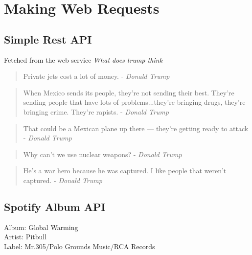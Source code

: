 \documentclass{article}
\begin{document}
  

  \section{Making Web Requests}
  \label{sec:Making Web Requests}

    \subsection{Simple Rest API}
    \label{sub:Simple Rest API}
      Fetched from the web service \textit{What does trump think}\\
                    \begin{quote}
          Private jets cost a lot of money. - \textit{Donald Trump}
        \end{quote}
                    \begin{quote}
          When Mexico sends its people, they're not sending their best. They're sending people that have lots of problems...they're bringing drugs, they're bringing crime. They're rapists. - \textit{Donald Trump}
        \end{quote}
                    \begin{quote}
          That could be a Mexican plane up there — they're getting ready to attack - \textit{Donald Trump}
        \end{quote}
                    \begin{quote}
          Why can’t we use nuclear weapons? - \textit{Donald Trump}
        \end{quote}
                    \begin{quote}
          He’s a war hero because he was captured. I like people that weren’t captured. - \textit{Donald Trump}
        \end{quote}
      

    \subsection{Spotify Album API}
    \label{sub:Spotify Album API}
        Album: Global Warming \\
    Artist: Pitbull \\
    Label: Mr.305/Polo Grounds Music/RCA Records \\
\end{document}
